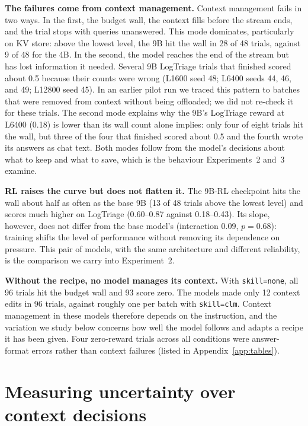 \documentclass{article}
\begin{document}
\textbf{The failures come from context management.} Context management fails in two ways.
In the first, the budget wall, the context fills before the stream ends, and the trial stops with queries unanswered.
This mode dominates, particularly on KV store: above the lowest level, the 9B hit the wall in 28 of 48 trials, against 9 of 48 for the 4B.
In the second, the model reaches the end of the stream but has lost information it needed.
Several 9B LogTriage trials that finished scored about 0.5 because their counts were wrong (L1600 seed 48; L6400 seeds 44, 46, and 49; L12800 seed 45).
In an earlier pilot run we traced this pattern to batches that were removed from context without being offloaded; we did not re-check it for these trials.
The second mode explains why the 9B's LogTriage reward at L6400 (0.18) is lower than its wall count alone implies: only four of eight trials hit the wall, but three of the four that finished scored about 0.5 and the fourth wrote its answers as chat text.
Both modes follow from the model's decisions about what to keep and what to save, which is the behaviour Experiments~2 and~3 examine.

\textbf{RL raises the curve but does not flatten it.} The 9B-RL checkpoint hits the wall about half as often as the base 9B (13 of 48 trials above the lowest level) and scores much higher on LogTriage (0.60--0.87 against 0.18--0.43).
Its slope, however, does not differ from the base model's (interaction $0.09$, $p=0.68$): training shifts the level of performance without removing its dependence on pressure.
This pair of models, with the same architecture and different reliability, is the comparison we carry into Experiment~2.

\textbf{Without the recipe, no model manages its context.} With \texttt{skill=none}, all 96 trials hit the budget wall and 93 score zero.
The models made only 12 context edits in 96 trials, against roughly one per batch with \texttt{skill=clm}.
Context management in these models therefore depends on the instruction, and the variation we study below concerns how well the model follows and adapts a recipe it has been given.
Four zero-reward trials across all conditions were answer-format errors rather than context failures (listed in Appendix~\ref{app:tables}).

\section{Measuring uncertainty over context decisions}
\label{sec:method}
\end{document}
